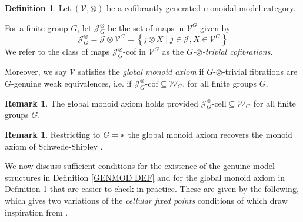 \documentclass[a4paper,10pt
,draft
]{article}%
\numberwithin{equation}{section}
\numberwithin{figure}{section}
\theoremstyle{definition} %
\newtheorem{definition}[equation]{Definition}%
\newtheorem{remark}[equation]{Remark}%
\newcommand{\sets}[2]{\left\{ #1 \;|\; #2\right\}}%
\newcommand{\V}{\ensuremath{\mathcal V}}
\newcommand{\1}{\ensuremath{\mathbbm 1}}%
\begin{document}
\begin{definition}\label{GLOBMONAX_DEF}
	Let $(\V,\otimes)$ 
	be a cofibrantly generated monoidal model category.
		
	For a finite group $G$, let $\mathcal{J}^{\otimes}_G$ be the set of
	maps in $\V^G$ given by 
\[
\mathcal{J}^{\otimes}_G
=
\mathcal J \otimes \V^G
=
\sets{j \otimes X}{j \in \mathcal{J},X \in \V^G}
\]
We refer to the class of maps  
$\mathcal{J}^{\otimes}_G$-cof in $\V^G$
as the \emph{$G$-$\otimes$-trivial cofibrations}.

Moreover, we say $\V$ satisfies the \textit{global monoid axiom} if
$G$-$\otimes$-trivial fibrations are $G$-genuine weak equivalences,
i.e. if $\mathcal J^{\otimes}_G \text{-cof} \subseteq \mathcal W_G$,
for all finite groups $G$.
\end{definition}



\begin{remark}
	The global monoid axiom holds provided
	$\mathcal J^{\otimes}_G \text{-cell} \subseteq \mathcal W_G$
	for all finite groups $G$.
\end{remark}


\begin{remark}\label{MONAX_REM}
	Restricting to $G = \**$ the global monoid axiom  
	recovers the monoid axiom of Schwede-Shipley \cite{SS00}.
\end{remark}



We now discuss sufficient conditions 
for the existence of the genuine model structures in 
Definition \ref{GENMOD DEF}
and for the global monoid axiom in 
Definition \ref{GLOBMONAX_DEF}
that are easier to check in practice.
These are given by the following,
which gives two variations of the 
\emph{cellular fixed points} conditions of
\cite[Prop. 2.6]{Ste16}
which draw inspiration from \cite[Remark 2.7]{Ste16}.
\end{document}
